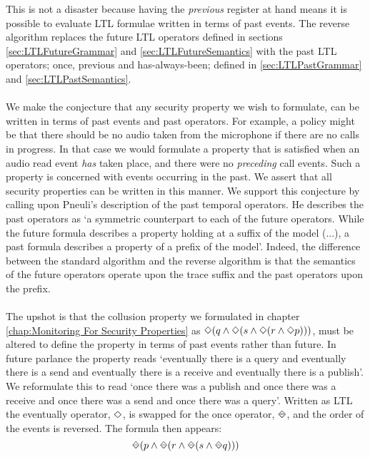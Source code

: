 This is not a disaster because having the \textit{previous} register at hand means it is possible to evaluate LTL formulae written in terms of past events.  The reverse algorithm replaces the future LTL operators defined in sections \ref{sec:LTLFutureGrammar} and \ref{sec:LTLFutureSemantics} with the past LTL operators; once, previous and has-always-been; defined in \ref{sec:LTLPastGrammar} and \ref{sec:LTLPastSemantics}.\\
\\
\noindent
We make the conjecture that any security property we wish to formulate, can be written in terms of past events and past operators.  For example, a policy might be that there should be no audio taken from the microphone if there are no calls in progress.  In that case we would formulate a property that is satisfied when an audio read event \textit{has} taken place, and there were no \textit{preceding} call events.  Such a property is concerned with events occurring in the past.  We assert that all security properties can be written in this manner.  We support this conjecture by calling upon Pneuli's description of the past temporal operators.  He describes the past operators as `a symmetric counterpart to each of the future operators.  While the future formula describes a property holding at a suffix of the model (...), a past formula describes a property of a prefix of the model'\cite{PnueliFuturePastOperators}.  Indeed, the difference between the standard algorithm and the reverse algorithm is that the semantics of the future operators operate upon the trace suffix and the past operators upon the prefix.\\
\\
\noindent
The upshot is that the collusion property we formulated in chapter \ref{chap:Monitoring For Security Properties} as $\Diamond(q \land \Diamond(s \land \Diamond(r \land \Diamond p)))$, must be altered to define the property in terms of past events rather than future.  In future parlance the property reads `eventually there is a query and eventually there is a send and eventually there is a receive and eventually there is a publish'.  We reformulate this to read `once there was a publish and once there was a receive and once there was a send and once there was a query'.  Written as LTL the eventually operator, $\Diamond$, is swapped for the once operator, $\LTLonce$, and the order of the events is reversed.  The formula then appears:\\

$$\LTLonce(p \land \LTLonce(r \land \LTLonce(s \land \LTLonce q)))$$\\  

